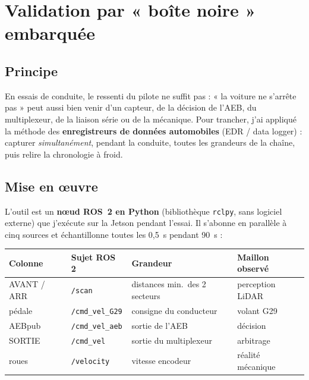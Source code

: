 \documentclass[11pt,a4paper]{article}
\begin{document}
\section{Validation par « boîte noire » embarquée}
\subsection{Principe}
En essais de conduite, le ressenti du pilote ne suffit pas : « la voiture ne
s'arrête pas » peut aussi bien venir d'un capteur, de la décision de l'AEB, du
multiplexeur, de la liaison série ou de la mécanique. Pour trancher, j'ai appliqué
la méthode des \textbf{enregistreurs de données automobiles} (EDR / data logger) :
capturer \emph{simultanément}, pendant la conduite, toutes les grandeurs de la
chaîne, puis relire la chronologie à froid.

\subsection{Mise en œuvre}
L'outil est un \textbf{nœud ROS~2 en Python} (bibliothèque \texttt{rclpy}, sans
logiciel externe) que j'exécute sur la Jetson pendant l'essai. Il s'abonne en
parallèle à cinq sources et échantillonne toutes les 0,5~s pendant 90~s :

\begin{center}
\renewcommand{\arraystretch}{1.15}
\begin{tabular}{@{}llll@{}}
\toprule
\textbf{Colonne} & \textbf{Sujet ROS 2} & \textbf{Grandeur} & \textbf{Maillon observé} \\
\midrule
AVANT / ARR & \texttt{/scan} & distances min.\ des 2 secteurs & perception LiDAR \\
pédale      & \texttt{/cmd\_vel\_G29} & consigne du conducteur & volant G29 \\
AEBpub      & \texttt{/cmd\_vel\_aeb} & sortie de l'AEB & décision \\
SORTIE      & \texttt{/cmd\_vel} & sortie du multiplexeur & arbitrage \\
roues       & \texttt{/velocity} & vitesse encodeur & réalité mécanique \\
\bottomrule
\end{tabular}
\end{center}
\end{document}
